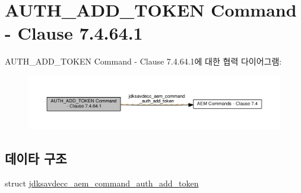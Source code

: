 \hypertarget{group__command__auth__add__token}{}\section{A\+U\+T\+H\+\_\+\+A\+D\+D\+\_\+\+T\+O\+K\+EN Command -\/ Clause 7.4.64.1}
\label{group__command__auth__add__token}
A\+U\+T\+H\+\_\+\+A\+D\+D\+\_\+\+T\+O\+K\+EN Command -\/ Clause 7.4.64.1에 대한 협력 다이어그램\+:
\nopagebreak
\begin{figure}[H]
\begin{center}
\leavevmode
\includegraphics[width=350pt]{group__command__auth__add__token}
\end{center}
\end{figure}
\subsection*{데이타 구조}
\begin{DoxyCompactItemize}
\item 
struct \hyperlink{structjdksavdecc__aem__command__auth__add__token}{jdksavdecc\+\_\+aem\+\_\+command\+\_\+auth\+\_\+add\+\_\+token}
\end{DoxyCompactItemize}
